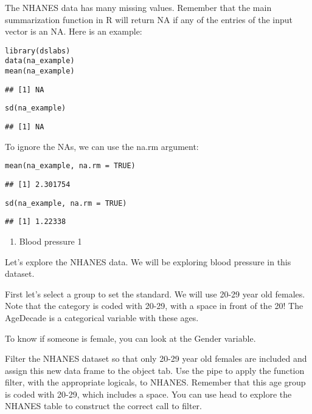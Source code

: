 \documentclass[]{article}
\providecommand{\tightlist}{%
  \setlength{\itemsep}{0pt}\setlength{\parskip}{0pt}}
\begin{document}
The NHANES data has many missing values. Remember that the main
summarization function in R will return NA if any of the entries of the
input vector is an NA. Here is an example:

\begin{verbatim}
library(dslabs)
data(na_example)
mean(na_example)
\end{verbatim}

\begin{verbatim}
## [1] NA
\end{verbatim}

\begin{verbatim}
sd(na_example)
\end{verbatim}

\begin{verbatim}
## [1] NA
\end{verbatim}

To ignore the NAs, we can use the na.rm argument:

\begin{verbatim}
mean(na_example, na.rm = TRUE)
\end{verbatim}

\begin{verbatim}
## [1] 2.301754
\end{verbatim}

\begin{verbatim}
sd(na_example, na.rm = TRUE)
\end{verbatim}

\begin{verbatim}
## [1] 1.22338
\end{verbatim}

\begin{enumerate}
\def\labelenumi{\arabic{enumi}.}
\tightlist
\item
  Blood pressure 1
\end{enumerate}

Let's explore the NHANES data. We will be exploring blood pressure in
this dataset.

First let's select a group to set the standard. We will use 20-29 year
old females. Note that the category is coded with 20-29, with a space in
front of the 20! The AgeDecade is a categorical variable with these
ages.

To know if someone is female, you can look at the Gender variable.

Filter the NHANES dataset so that only 20-29 year old females are
included and assign this new data frame to the object tab. Use the pipe
to apply the function filter, with the appropriate logicals, to NHANES.
Remember that this age group is coded with 20-29, which includes a
space. You can use head to explore the NHANES table to construct the
correct call to filter.
\end{document}
